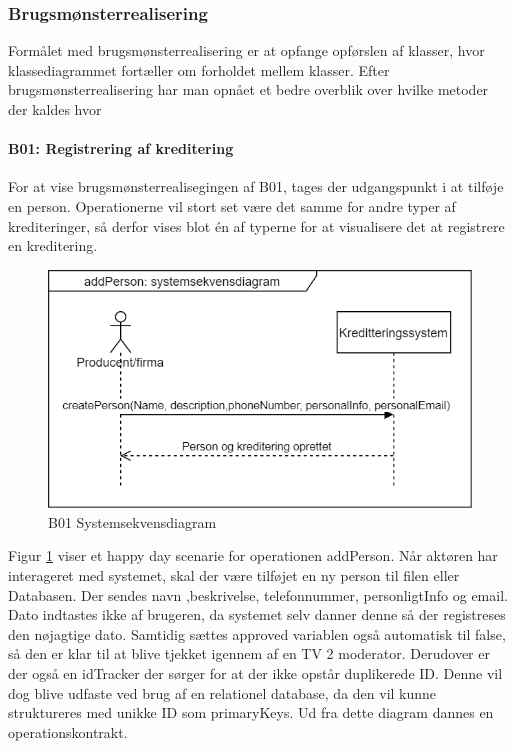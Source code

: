 \subsubsection{Brugsmønsterrealisering} Formålet med brugsmønsterrealisering er at opfange opførslen af klasser, hvor klassediagrammet fortæller om forholdet mellem klasser. Efter brugsmønsterrealisering har man opnået et bedre overblik over hvilke metoder der kaldes hvor

\paragraph{B01: Registrering af kreditering} For at vise brugsmønsterrealisegingen af B01, tages der udgangspunkt i at tilføje en person. Operationerne vil stort set være det samme for andre typer af krediteringer, så derfor vises blot én af typerne for at visualisere det at registrere en kreditering.

\begin{figure}[H]
    \centering
    \includegraphics[scale = 0.4]{images/B01SSD.png}
    \caption{B01 Systemsekvensdiagram}
    \label{fig:B01_Systemsekvensdiagram}
\end{figure}

Figur \ref{fig:B01_Systemsekvensdiagram} viser et happy day scenarie for operationen addPerson. Når aktøren har interageret med systemet, skal der være tilføjet en ny person til filen eller Databasen. Der sendes navn ,beskrivelse, telefonnummer, personligtInfo og email. Dato indtastes ikke af brugeren, da systemet selv danner denne så der registreses den nøjagtige dato. Samtidig sættes approved variablen også automatisk til false, så den er klar til at blive tjekket igennem af en TV 2 moderator. Derudover er der også en idTracker der sørger for at der ikke opstår duplikerede ID. Denne vil dog blive udfaste ved brug af en relationel database, da den vil kunne struktureres med unikke ID som primaryKeys.  Ud fra dette diagram dannes en operationskontrakt.



